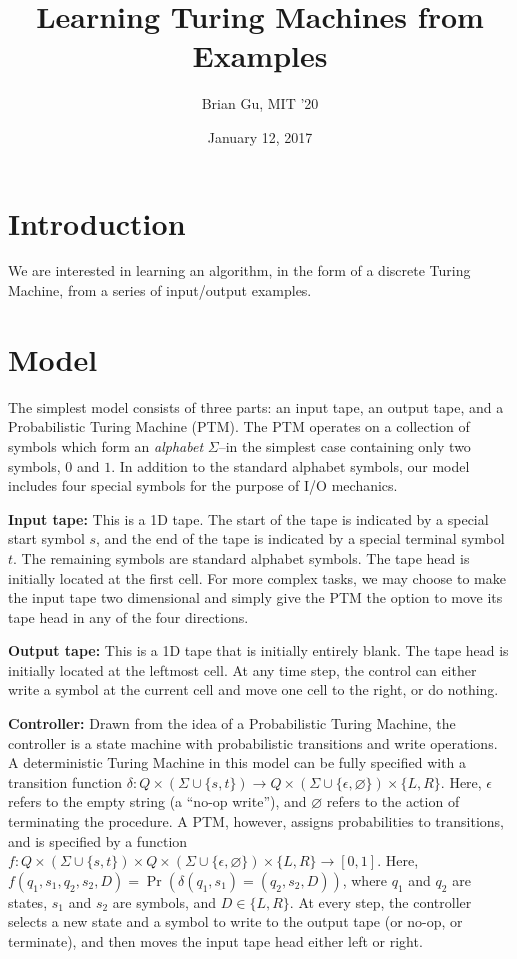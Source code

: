 \documentclass{article}
\title{Learning Turing Machines from Examples}
\author{Brian Gu, MIT '20}
\date{January 12, 2017}
\begin{document}
\maketitle

\section{Introduction}
We are interested in learning an algorithm, in the form of a discrete Turing Machine, from a series of input/output examples.

\section{Model}
The simplest model consists of three parts: an input tape, an output tape, and a Probabilistic Turing Machine (PTM). The PTM operates on a collection of symbols which form an \textit{alphabet} $\Sigma$--in the simplest case containing only two symbols, $0$ and $1$. In addition to the standard alphabet symbols, our model includes four special symbols for the purpose of I/O mechanics. 

\textbf{Input tape:} This is a 1D tape. The start of the tape is indicated by a special start symbol $s$, and the end of the tape is indicated by a special terminal symbol $t$. The remaining symbols are standard alphabet symbols. The tape head is initially located at the first cell. For more complex tasks, we may choose to make the input tape two dimensional and simply give the PTM the option to move its tape head in any of the four directions.

\textbf{Output tape:} This is a 1D tape that is initially entirely blank. The tape head is initially located at the leftmost cell. At any time step, the control can either write a symbol at the current cell and move one cell to the right, or do nothing. 

\textbf{Controller:} Drawn from the idea of a Probabilistic Turing Machine, the controller is a state machine with probabilistic transitions and write operations. A deterministic Turing Machine in this model can be fully specified with a transition function $\delta: Q \times (\Sigma \cup \{s,t\}) \rightarrow Q \times (\Sigma \cup \{\epsilon, \varnothing\}) \times \{L, R\}$. Here, $\epsilon$ refers to the empty string (a ``no-op write''), and $\varnothing$ refers to the action of terminating the procedure. A PTM, however, assigns probabilities to transitions, and is specified by a function $f: Q \times (\Sigma \cup \{s,t\}) \times Q \times (\Sigma \cup \{\epsilon, \varnothing\}) \times \{L, R\} \rightarrow [0,1]$. Here, $f(q_1, s_1, q_2, s_2, D) = \Pr(\delta(q_1, s_1) = (q_2, s_2, D))$, where $q_1$ and $q_2$ are states, $s_1$ and $s_2$ are symbols, and $D \in \{L, R\}$. At every step, the controller selects a new state and a symbol to write to the output tape (or no-op, or terminate), and then moves the input tape head either left or right.
\end{document}
